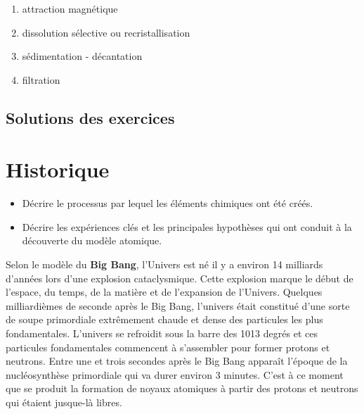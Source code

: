 \documentclass[
  11pt,
  a4paper,
  openany]{book}
\providecommand{\tightlist}{%
  \setlength{\itemsep}{0pt}\setlength{\parskip}{0pt}}
\begin{document}
\begin{Answer}

\begin{enumerate}
\def\labelenumi{\arabic{enumi}.}
\tightlist
\item
  attraction magnétique
\item
  dissolution sélective ou recristallisation
\item
  sédimentation - décantation
\item
  filtration
\end{enumerate}

\end{Answer}

\newpage

\section{Solutions des exercices} \shipoutAnswer

\hypertarget{historique}{%
\chapter{Historique}\label{historique}}

\begin{objectives}

\begin{itemize}
\tightlist
\item
  Décrire le processus par lequel les éléments chimiques ont été créés.
\item
  Décrire les expériences clés et les principales hypothèses qui ont conduit à la découverte du modèle atomique.
\end{itemize}

\end{objectives}

Selon le modèle du \textbf{Big Bang}, l'Univers est né il y a environ 14 milliards d'années lors d'une explosion cataclysmique. Cette explosion marque le début de l'espace, du temps, de la matière et de l'expansion de l'Univers. Quelques milliardièmes de seconde après le Big Bang, l'univers était constitué d'une sorte de soupe primordiale extrêmement chaude et dense des particules les plus fondamentales. L'univers se refroidit sous la barre des 1013 degrés et ces particules fondamentales commencent à s'assembler pour former protons et neutrons. Entre une et trois secondes après le Big Bang apparaît l'époque de la nucléosynthèse primordiale qui va durer environ 3 minutes. C'est à ce moment que se produit la formation de noyaux atomiques à partir des protons et neutrons qui étaient jusque-là libres.
\end{document}
